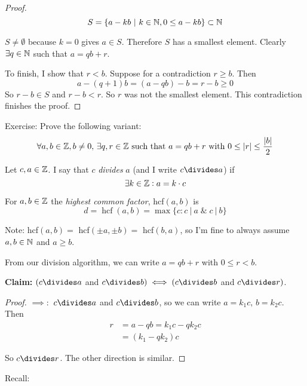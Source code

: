 \documentclass[twoside]{scrartcl}
\DeclareMathOperator{\hcf}{hcf}
\begin{document}
\begin{proof}
\[S = \{a - kb ~|~ k \in\mathbb{N}, 0 \leq a - kb \} \subset \mathbb{N}\]	

$S \neq \emptyset$ because $k = 0$ gives $a \in S$. Therefore $S$ has a smallest element. Clearly $\exists q \in\mathbb{N}$ such that $a = qb + r$. 

To finish, I show that $r < b$. Suppose for a contradiction $ r \geq b$. Then 
\[a - (q+1)b = (a-qb)- b = r-b \geq 0\]
So $r-b \in S$ and $r-b < r$. So $r$ was not the smallest element. This contradiction finishes the proof.
\end{proof}

Exercise: Prove the following variant: \[\forall a,b \in\mathbb{Z}, b \neq 0,\,\exists q,r\in\mathbb{Z}\text{ such that }a = qb + r\text{ with }0 \leq |r| \leq \frac{|b|}{2}\]

\begin{definition}
Let $c,a \in \mathbb{Z}$. I say that $c$ \emph{divides} $a$ (and I write $c \divides a$) if \[\exists k\in\mathbb{Z} : a = k\cdot c\]	
\end{definition}\vspace*{5pt}

\begin{definition}
For $a,b \in\mathbb{Z}$ the \emph{highest common factor}, hcf$(a,b)$ is 
\[d = \hcf(a,b) = \max\{c: c ~|~ a \;\&\; c ~|~ b\}\]
\end{definition}


\begin{algorithm}

Note: hcf$(a,b) = $ hcf$(\pm a,\pm b) = $ hcf$(b,a)$, so I'm fine to always assume $a,b \in\mathbb{N}$ and $a \geq b$. 

From our division algorithm, we can write $a = qb + r$ with $ 0 \leq r < b$.

\textbf{Claim:} $(c \divides a$ and $c \divides b) \iff (c \divides b$ and $c \divides r)$. 	
\end{algorithm}

\begin{proof}$\implies:$
$c \divides a$ and $c \divides b$, so we can write  $a = k_1c,\, b = k_2c$. Then
\[\begin{aligned}r &= a - qb = k_1c - qk_2c\\ &= (k_1-qk_2)c\end{aligned}\]

So $c \divides r$. 
The other direction is similar. 
\end{proof}

Recall:\\
\end{document}
